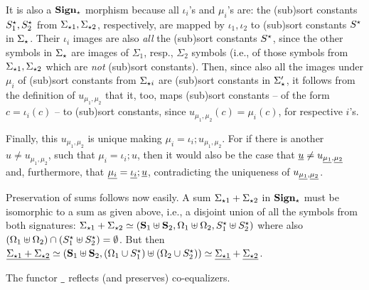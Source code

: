\begin{PROOF}
It is also a
${\bf Sign_\star}$ morphism because all $\iota_i$'s and $\mu_i$'s
are: the (sub)sort constants $S^\star_1, S^\star_2$ from $\Sigma_{\star 1},
\Sigma_{\star 2}$, respectively, are mapped by $\iota_1,\iota_2$ to (sub)sort constants
${S^\star}$ in $\Sigma_\star$. Their $\iota_i$ images are also {\em all} the (sub)sort
constants ${S^\star}$, since the other symbols in $\Sigma_\star$ are images
of $\Sigma_1$, resp., $\Sigma_2$ symbols (i.e., of those symbols from
$\Sigma_{\star 1}, \Sigma_{\star 2}$ which are {\em
not} (sub)sort constants). Then, since also all the images under $\mu_i$ of (sub)sort constants
from $\Sigma_{\star i}$ are (sub)sort constants in $\Sigma'_\star$, it
follows from the definition of $u_{\mu_{1},\mu_{2}}$ that it, too, maps
(sub)sort constants -- of the form $c=\iota_i(c)$ -- to (sub)sort constants,
since $u_{\mu_{1},\mu_{2}}(c)=\mu_i(c)$, for respective $i$'s.

Finally, this $u_{\mu_{1},\mu_{2}}$ is unique making
$\mu_i=\iota_i;u_{\mu_{1},\mu_{2}}$. For if there is another $u\not=
u_{\mu_{1},\mu_{2}}$, such that $\mu_i=\iota_i;u$, then it would also be the
case that $\underline{u}\not= u_{\underline{\mu_{1}},\underline{\mu_{2}}}$ and,
furthermore, that
$\underline{\mu_i}=\underline{\iota_i};\underline{u}$, contradicting the
uniqueness of $u_{\underline{\mu_{1}},\underline{\mu_{2}}}$. 

Preservation of sums follows now easily. A sum $\Sigma_{\star
1}+\Sigma_{\star 2}$ in ${\bf Sign_\star}$ must be
isomorphic to a sum as given above, i.e., a disjoint union of all the symbols
from both signatures: 
$\Sigma_{\star 1}+\Sigma_{\star 2}\mathrel{\simeq}
({\bf S}_1\uplus{\bf S}_2,\Omega_1\uplus\Omega_2,S^\star_1\uplus S^\star_2)$ where
also $(\Omega_1\uplus\Omega_2)\cap(S^\star_1\uplus S^\star_2)=\emptyset$. 
But
then $\underline{\Sigma_{\star 1}+\Sigma_{\star 2}} \mathrel{\simeq}
({\bf S}_1\uplus{\bf S}_2,(\Omega_1\cup S^\star_1)\uplus(\Omega_2\cup S^\star_2))\mathrel{\simeq}
\underline{\Sigma_{\star 1}} + \underline{\Sigma_{\star 2}}$.
\end{PROOF}
%
\begin{lemma}\label{fa:coeq}
The functor $\underline{\ }$ reflects (and preserves) co-equalizers. 
\end{lemma}
%
